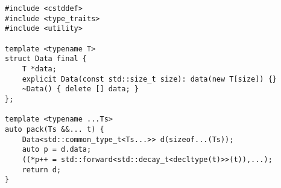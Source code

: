 \begin{lstlisting}[title=\href{https://godbolt.org/z/AuTYzP}{\texttt{godbolt.org/z/AuTYzP}}]
#include <cstddef>
#include <type_traits>
#include <utility>

template <typename T>
struct Data final {
    T *data;
    explicit Data(const std::size_t size): data(new T[size]) {}
    ~Data() { delete [] data; }
};

template <typename ...Ts>
auto pack(Ts &&... t) {
    Data<std::common_type_t<Ts...>> d(sizeof...(Ts));
    auto p = d.data;
    ((*p++ = std::forward<std::decay_t<decltype(t)>>(t)),...);
    return d;
}
\end{lstlisting}

